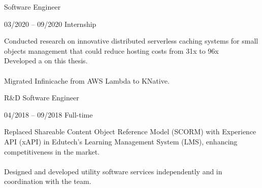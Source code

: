 \documentclass[9pt, green]{template/developercv} %
\begin{document}
{\begin{entrylist}
{		
	}
	{Software Engineer}
	
	\entry
	{03/2020 -- 09/2020}
	{}
	{Internship}
	{
		\vspace{0.3mm}
		\begin{minipage}[t]{0.75\textwidth}
			\vspace{-\baselineskip}
			\itemmarker Conducted research on innovative distributed serverless caching systems for small objects management that could reduce hosting costs from 31x to 96x\\
			\itemmarker Developed a  on this thesis.\\
			\vspace{-3mm}\\
			\itemmarker Migrated Infinicache from AWS Lambda to KNative.\\
			\vspace{-3mm}
		\end{minipage}

	}
	{R\&D Software Engineer}
	
	\entry
		{04/2018 -- 09/2018}
		{}
		{Full-time}
		{
			\vspace{0.3mm}
			\begin{minipage}[t]{0.75\textwidth}
				\vspace{-\baselineskip}
				\itemmarker Replaced Shareable Content Object Reference Model (SCORM) with Experience API (xAPI) in Edutech's Learning Management System (LMS), enhancing competitiveness in the market.\\
				\vspace{-3mm}\\
				\itemmarker Designed and developed utility software services independently and in coordination with the team.\\
				\vspace{-3mm}
			\end{minipage}

}
\end{entrylist}}
\end{document}
